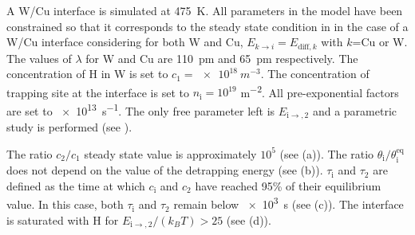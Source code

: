 

\indent A W/Cu interface is simulated at \SI{475}{K}.
All parameters in the model have been constrained so that it corresponds to the steady state condition in  in the case of a W/Cu interface considering for both W and Cu, $E_{k\rightarrow i}=E_{\mathrm{diff},k}$ with $k$=Cu or W.
The values of $\lambda$ for W and Cu are \SI{110}{pm} and \SI{65}{pm} respectively.
The concentration of H in W is set to $c_1=\SI{e18}{m^{-3}}$.
The concentration of trapping site at the interface is set to $n_\mathrm{i}=10^{19}$ \si{m^{-2}}.
All pre-exponential factors are set to \SI{e13}{s^{-1}}.
The only free parameter left is $E_{\mathrm{i\rightarrow},2}$ and a parametric study is performed (see ).

The ratio $c_2/c_1$ steady state value is approximately $10^5$ (see (a)).
The ratio $\theta_\mathrm{i}/\theta_\mathrm{i}^\mathrm{eq}$ does not depend on the value of the detrapping energy (see (b)).
$\tau_\mathrm{i}$ and $\tau_2$ are defined as the time at which $c_\mathrm{i}$ and $c_2$ have reached 95\% of their equilibrium value.
In this case, both $\tau_\mathrm{i}$ and $\tau_2$ remain below \SI{e3}{s} (see (c)).
The interface is saturated with H for $E_{\mathrm{i\rightarrow},2}/(k_B T) > 25$ (see (d)).

